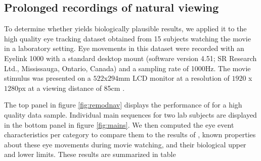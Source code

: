 \subsection*{Prolonged recordings of natural viewing}\label{ana_2}


To determine whether \remodnav yields biologically plausible results, we applied it to the high quality eye tracking dataset obtained from 15 subjects watching the movie in a laboratory setting. Eye movements in this dataset were recorded with an Eyelink 1000 with a standard desktop mount (software version 4.51; SR Research Ltd., Mississauga, Ontario, Canada) and a sampling rate of 1000Hz. The movie stimulus was presented on a $522$x$294$mm LCD monitor at a resolution of $1920$ x $1280$px at a viewing distance of 85cm \citep{Hanke2016}.

The top panel in figure \ref{fig:remodnav} displays the performance of \remodnav for a high quality data sample. Individual main sequences for two lab subjects are displayed in the bottom panel in figure \ref{fig:mains}. We then computed the eye event characteristics per category to compare them to the results of \cite{Andersson2017}, known properties about these eye movements during movie watching, and their biological upper and lower limits. These results are summarized in table  



